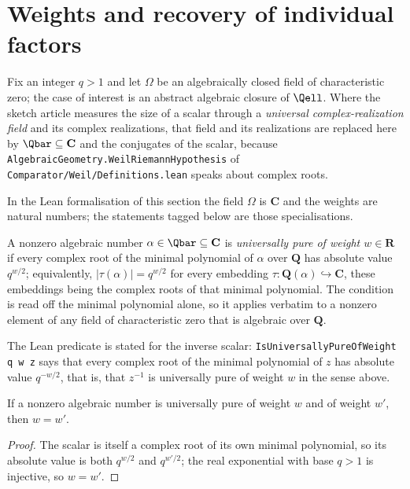 \section{Weights and recovery of individual factors}\label{sec:zla-weights}

Fix an integer $q>1$ and let $\Omega$ be an algebraically closed field of
characteristic zero; the case of interest is an abstract algebraic closure of
$\Qell$.  Where the sketch article measures the size of a scalar through a
\emph{universal complex-realization field} and its complex realizations, that
field and its realizations are replaced here by $\Qbar\subseteq\mathbf C$ and
the conjugates of the scalar, because
\texttt{AlgebraicGeometry.WeilRiemannHypothesis} of
\texttt{Comparator/Weil/Definitions.lean} speaks about complex roots.

In the Lean formalisation of this section the field $\Omega$ is $\mathbf C$ and
the weights are natural numbers; the statements tagged below are those
specialisations.

\begin{definition}
\label{def:zla-universal-purity}
A nonzero algebraic number $\alpha\in\Qbar\subseteq\mathbf C$ is
\emph{universally pure of weight $w\in\mathbf R$} if every complex root of the
minimal polynomial of $\alpha$ over $\mathbf Q$ has absolute value $q^{w/2}$;
equivalently, $|\tau(\alpha)|=q^{w/2}$ for every embedding
$\tau:\mathbf Q(\alpha)\hookrightarrow\mathbf C$, these embeddings being the
complex roots of that minimal polynomial.  The condition is read off the
minimal polynomial alone, so it applies verbatim to a nonzero element of any
field of characteristic zero that is algebraic over $\mathbf Q$.
\end{definition}

The Lean predicate is stated for the inverse scalar:
\texttt{IsUniversallyPureOfWeight q w z} says that every complex root of the
minimal polynomial of $z$ has absolute value $q^{-w/2}$, that is, that
$z^{-1}$ is universally pure of weight $w$ in the sense above.

\begin{lemma}
\label{lem:zla-scalar-weight-unique}
\leanok
If a nonzero algebraic number is universally pure of weight $w$ and of weight
$w'$, then $w=w'$.
\end{lemma}
\begin{proof}
\leanok
The scalar is itself a complex root of its own minimal polynomial, so its
absolute value is both $q^{w/2}$ and $q^{w'/2}$; the real exponential with
base $q>1$ is injective, so $w=w'$.
\end{proof}

